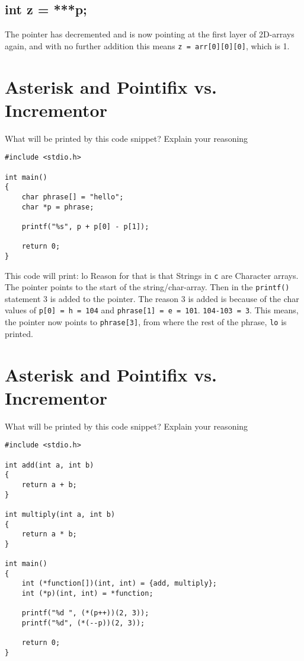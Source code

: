 \documentclass{article}
\begin{document}
\subsection{int z = ***p;}
The pointer has decremented and is now pointing at the
first layer of 2D-arrays again, and with no further addition
this means \verb|z = arr[0][0][0]|, which is 1.

\section{Asterisk and Pointifix vs. Incrementor}
What will be printed by this code snippet? Explain your reasoning
\begin{verbatim}
#include <stdio.h>

int main()
{
    char phrase[] = "hello";
    char *p = phrase;

    printf("%s", p + p[0] - p[1]);

    return 0;
}
\end{verbatim}
This code will print: lo \newline
Reason for that is that Strings in \verb|c| are Character arrays. 
The pointer points to the start of the string/char-array. 
Then in the \verb|printf()| statement 3 is added to the pointer.
The reason 3 is added is because of the char values of 
\verb|p[0] = h = 104| and \verb|phrase[1] = e = 101|. 
\verb|104-103 = 3|. This means, the pointer now points to
 \verb|phrase[3]|, from where the rest of the phrase, \verb|lo|
  is printed.




  \section{Asterisk and Pointifix vs. Incrementor}
  What will be printed by this code snippet? Explain your reasoning
  \begin{verbatim}
#include <stdio.h>

int add(int a, int b)
{
    return a + b;
}

int multiply(int a, int b)
{
    return a * b;
}

int main()
{
    int (*function[])(int, int) = {add, multiply};
    int (*p)(int, int) = *function;

    printf("%d ", (*(p++))(2, 3));
    printf("%d", (*(--p))(2, 3));

    return 0;
}

  \end{verbatim}
\end{document}
